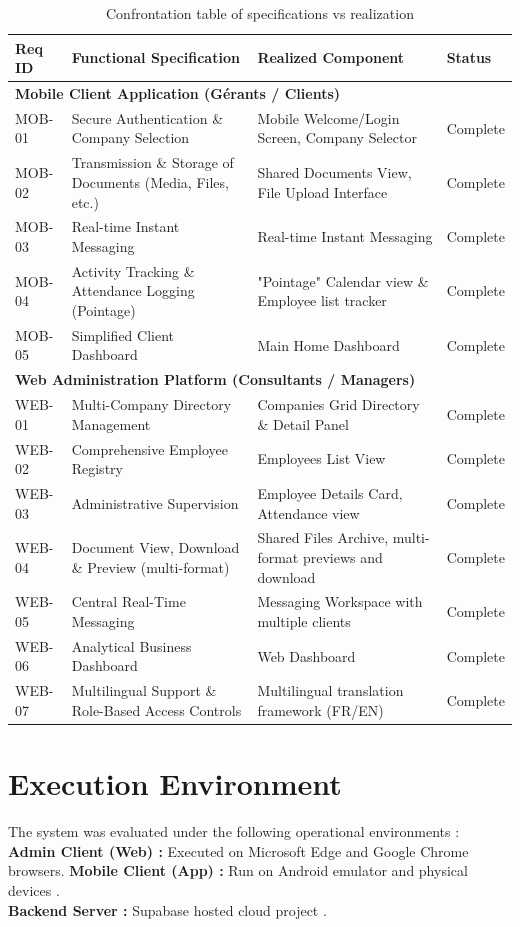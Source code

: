 \begin{table}[H]
\centering
\caption{Confrontation table of specifications vs realization}
\label{tab:confrontation}
\begin{tabular}{|l|p{5cm}|p{5cm}|l|}
\hline
\textbf{Req ID} & \textbf{Functional Specification} & \textbf{Realized Component} & \textbf{Status} \\
\hline
\multicolumn{4}{|l|}{\textbf{Mobile Client Application (Gérants / Clients)}} \\
\hline
MOB-01 & Secure Authentication \& Company Selection & Mobile Welcome/Login Screen, Company Selector & Complete \\
\hline
MOB-02 & Transmission \& Storage of Documents (Media, Files, etc.) & Shared Documents View, File Upload Interface & Complete \\
\hline
MOB-03 & Real-time Instant Messaging & Real-time Instant Messaging & Complete \\
\hline
MOB-04 & Activity Tracking \& Attendance Logging (Pointage) & "Pointage" Calendar view \& Employee list tracker & Complete \\
\hline
MOB-05 & Simplified Client Dashboard & Main Home Dashboard & Complete \\
\hline
\multicolumn{4}{|l|}{\textbf{Web Administration Platform (Consultants / Managers)}} \\
\hline
WEB-01 & Multi-Company Directory Management & Companies Grid Directory \& Detail Panel & Complete \\
\hline
WEB-02 & Comprehensive Employee Registry & Employees List View & Complete \\
\hline
WEB-03 & Administrative Supervision & Employee Details Card, Attendance view & Complete \\
\hline
WEB-04 & Document View, Download \& Preview (multi-format) & Shared Files Archive, multi-format previews and download & Complete \\
\hline
WEB-05 & Central Real-Time Messaging & Messaging Workspace with multiple clients & Complete \\
\hline
WEB-06 & Analytical Business Dashboard & Web Dashboard & Complete \\
\hline
WEB-07 & Multilingual Support \& Role-Based Access Controls & Multilingual translation framework (FR/EN) & Complete \\
\hline
\end{tabular}
\end{table}

\section{Execution Environment}
The system was evaluated under the following operational environments :\\
\textbf{Admin Client (Web) : } Executed on Microsoft Edge and Google Chrome browsers.
\textbf{Mobile Client (App) : }  Run on Android emulator and physical devices .\\
\textbf{Backend Server : } Supabase hosted cloud project .

